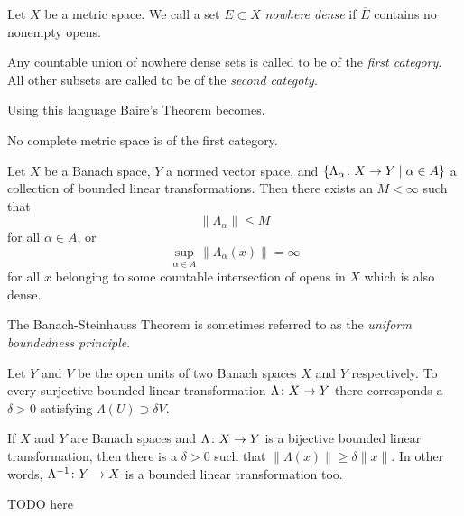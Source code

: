 \begin{definition}
  Let $X$ be a metric space. We call a set $E \subset X$ \emph{nowhere dense} if $\overline{E}$ contains no nonempty opens.
\end{definition}

\begin{definition}
  Any countable union of nowhere dense sets is called to be of the \emph{first category}. All other subsets are called to be of the \emph{second categoty}.
\end{definition}

Using this language Baire's Theorem becomes.

\begin{corollary}
  No complete metric space is of the first category.
\end{corollary}

\begin{theorem}
  Let $X$ be a Banach space, $Y$ a normed vector space, and $\{ \Lambda_\alpha \colon X \rightarrow Y \;|\; \alpha \in A \}$ a collection of bounded linear transformations. Then there exists an $M < \infty$ such that
  \[
  \|\Lambda_\alpha\| \leq M
  \]
  for all $\alpha \in A$, or
  \[
  \sup_{\alpha \in A} \|\Lambda_\alpha(x)\| = \infty
  \]
  for all $x$ belonging to some countable intersection of opens in $X$ which is also dense.
\end{theorem}

\begin{remark}
  The Banach-Steinhauss Theorem is sometimes referred to as the \emph{uniform boundedness principle}.
\end{remark}

\begin{theorem}
  Let $Y$ and $V$ be the open units of two Banach spaces $X$ and $Y$ respectively. To every surjective bounded linear transformation $\Lambda \colon X \rightarrow Y$ there corresponds a $\delta > 0$ satisfying $\Lambda(U) \supset \delta V$.
\end{theorem}

\begin{theorem}
  If $X$ and $Y$ are Banach spaces and $\Lambda \colon X \rightarrow Y$ is a bijective bounded linear transformation, then there is a $\delta > 0$ such that $\|\Lambda(x)\| \geq \delta\|x\|$. In other words, $\Lambda^{-1} \colon Y \rightarrow X$ is a bounded linear transformation too.
\end{theorem}

TODO here

